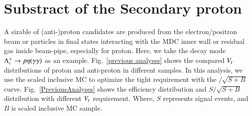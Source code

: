\section{Substract of the Secondary proton}

A sizable of (anti-)proton candidates are produced from the electron/positron beam or particles in final states interacting with the MDC inner wall or residual gas inside beam-pipe, especially for proton. Here, we take the decay mode $\Lambda_{c}^{+} \rightarrow p\eta(\gamma\gamma)$ as an example. Fig.~\ref{previous analyses} shows the compared $V_{\rm{r}}$ distributions of proton and anti-proton in different samples. In this analysis, we use the scaled inclusive MC to optimize the tight requirement with the $/\sqrt{S+B}$ curve. Fig.~\ref{PreviousAnalyses} shows the efficiency distribution and $S/\sqrt{S+B}$ distribution with different $V_{\rm{r}}$ requirement. Where, $S$ represents signal events, and $B$ is scaled inclusive MC sample.



